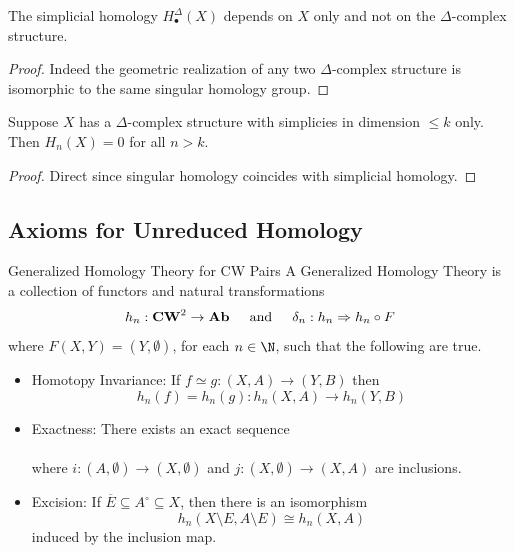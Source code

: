 \documentclass[a4paper]{article}
\begin{document}
\begin{crl}{}{} The simplicial homology $H_\bullet^\Delta(X)$ depends on $X$ only and not on the $\Delta$-complex structure. 
\begin{proof}
Indeed the geometric realization of any two $\Delta$-complex structure is isomorphic to the same singular homology group. 
\end{proof}
\end{crl}

\begin{crl}{}{} Suppose $X$ has a $\Delta$-complex structure with simplicies in dimension $\leq k$ only. Then $H_n(X)=0$ for all $n>k$. 
\begin{proof}
Direct since singular homology coincides with simplicial homology. 
\end{proof}
\end{crl}

\subsection{Axioms for Unreduced Homology}
\begin{defn}{Generalized Homology Theory for CW Pairs}{} A Generalized Homology Theory is a collection of functors and natural transformations $$h_n:\bold{CW}^2\to\bold{Ab}\;\;\;\;\text{ and }\;\;\;\;\delta_n:h_n\Rightarrow h_n\circ F$$ where $F(X,Y)=(Y,\emptyset)$, for each $n\in\N$, such that the following are true. 
\begin{itemize}
\item Homotopy Invariance: If $f\simeq g:(X,A)\to(Y,B)$ then $$h_n(f)=h_n(g):h_n(X,A)\to h_n(Y,B)$$
\item Exactness: There exists an exact sequence \\
\\
where $i:(A,\emptyset)\to(X,\emptyset)$ and $j:(X,\emptyset)\to(X,A)$ are inclusions. 
\item Excision: If $\overline{E}\subseteq A^\circ\subseteq X$, then there is an isomorphism $$h_n(X\setminus E,A\setminus E)\cong h_n(X,A)$$ induced by the inclusion map. 
\end{itemize}
\end{defn}
\end{document}
